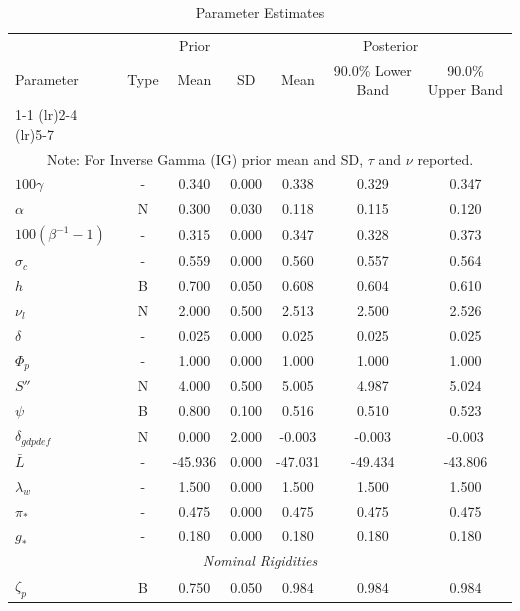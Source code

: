 \documentclass[12pt]{article}
\begin{document}
\pagestyle{empty}
\vspace*{.5cm}
{\small
\begin{longtable}{lcccccc}
\caption{Parameter Estimates}
\\ \hline
\multicolumn{1}{c}{} & \multicolumn{3}{c}{Prior} & \multicolumn{3}{c}{Posterior} \\
Parameter & Type & Mean & SD & Mean & 90.0\% {\tiny Lower Band} & 90.0\% {\tiny Upper Band} \\
\cmidrule(lr){1-1} \cmidrule(lr){2-4} \cmidrule(lr){5-7}
\endhead
\hline
\\ \multicolumn{7}{c}{\footnotesize Note: For Inverse Gamma (IG) prior mean and SD, $\tau$ and $\nu$ reported.}
\endfoot
\multicolumn{7}{c}{\textit{Steady State}} \\[3pt]
$100\gamma$ & - &    0.340 &    0.000 &    0.338 &    0.329 &    0.347 \\
$\alpha$ & N &    0.300 &    0.030 &    0.118 &    0.115 &    0.120 \\
$100(\beta^{-1} - 1)$ & - &    0.315 &    0.000 &    0.347 &    0.328 &    0.373 \\
$\sigma_{c}$ & - &    0.559 &    0.000 &    0.560 &    0.557 &    0.564 \\
$   h$ & B &    0.700 &    0.050 &    0.608 &    0.604 &    0.610 \\
$\nu_l$ & N &    2.000 &    0.500 &    2.513 &    2.500 &    2.526 \\
$\delta$ & - &    0.025 &    0.000 &    0.025 &    0.025 &    0.025 \\
$\Phi_p$ & - &    1.000 &    0.000 &    1.000 &    1.000 &    1.000 \\
$ S''$ & N &    4.000 &    0.500 &    5.005 &    4.987 &    5.024 \\
$\psi$ & B &    0.800 &    0.100 &    0.516 &    0.510 &    0.523 \\
$\delta_{gdpdef}$ & N &    0.000 &    2.000 &   -0.003 &   -0.003 &   -0.003 \\
$\bar{L}$ & - &  -45.936 &    0.000 &  -47.031 &  -49.434 &  -43.806 \\
$\lambda_w$ & - &    1.500 &    0.000 &    1.500 &    1.500 &    1.500 \\
$\pi_*$ & - &    0.475 &    0.000 &    0.475 &    0.475 &    0.475 \\
$ g_*$ & - &    0.180 &    0.000 &    0.180 &    0.180 &    0.180 \\
\multicolumn{7}{c}{\textit{Nominal Rigidities}} \\[3pt]
$\zeta_p$ & B &    0.750 &    0.050 &    0.984 &    0.984 &    0.984 \\

\end{longtable}}
\end{document}

